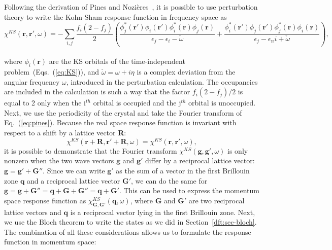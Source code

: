 \begin{refsection}
Following the derivation of Pines and Nozi\`eres~\cite{Nozieres1994}, it is possible to use perturbation theory to write the Kohn-Sham response function in frequency space as
\begin{equation}\label{eq:pines}
\chi^{KS}(\mathbf{r},\mathbf{r}', \omega) = - \sum_{i,j} \frac{f_i (2-f_j)}{2}\left( \frac{\phi_j^*(\mathbf{r'})\phi_i(\mathbf{r'})\phi_i^*(\mathbf{r})\phi_j(\mathbf{r})}{\epsilon_j - \epsilon_i - \check{\omega}} + \frac{\phi_i^*(\mathbf{r'})\phi_j(\mathbf{r'})\phi_j^*(\mathbf{r})\phi_i(\mathbf{r})}{\epsilon_j - \epsilon_ni + \check{\omega}} \right),
\end{equation}
\\
where $\phi_i(\mathbf{r})$ are the KS orbitals of the time-independent problem~(Eqs.~(\ref{eq:KS})), and $\check{\omega} = \omega + i \eta$ is a complex deviation from the angular frequency $\omega$, introduced in the perturbation calculation. The occupancies are included in the calculation is such a way that the factor $f_i (2-f_j)/2$ is equal to 2 only when the i$^{th}$ orbital is occupied and the j$^{th}$ orbital is unoccupied. Next, we use the periodicity of the crystal and take the Fourier transform of Eq.~(\ref{eq:pines}). Because the real space response function is invariant with respect to a shift by a lattice vector \textbf{R}: 
\begin{equation}
\chi^{KS}(\mathbf{r} + \mathbf{R},\mathbf{r}' + \mathbf{R}, \omega) = \chi^{KS}(\mathbf{r},\mathbf{r}', \omega),
\end{equation}
it is possible to demonstrate that the Fourier transform $\chi^{KS}(\mathbf{g},\mathbf{g}',\omega)$ is only nonzero when the two wave vectors $\mathbf{g}$ and $\mathbf{g}'$ differ by a reciprocal lattice vector: $\mathbf{g} = \mathbf{g}' + \mathbf{G}''$. Since we can write $\mathbf{g}'$ as the sum of a vector in the first Brillouin zone $\mathbf{q}$ and a reciprocal lattice vector $\mathbf{G}'$, we can do the same for $\mathbf{g} = \mathbf{g} + \mathbf{G}'' = \mathbf{q} + \mathbf{G} + \mathbf{G}'' = \mathbf{q} + \mathbf{G}'$. This can be used to express the momentum space response function as $\chi_{\mathbf{G},\mathbf{G}'}^{KS}(\mathbf{q},\omega)$, where $\mathbf{G}$ and $\mathbf{G}'$ are two reciprocal lattice vectors and $\mathbf{q}$ is a reciprocal vector lying in the first Brillouin zone. Next, we use the Bloch theorem to write the states as we did in Section~\ref{dft:sec-bloch}. The combination of all these considerations allows us to formulate the response function in momentum space:
\begin{equation}

\end{equation}
\end{refsection}

